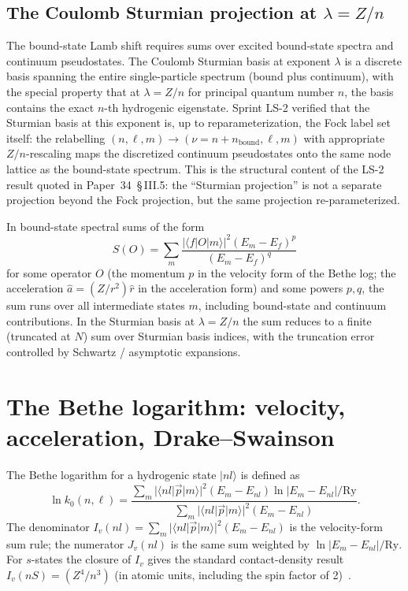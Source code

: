 \documentclass[11pt]{article}
\begin{document}
\subsection{The Coulomb Sturmian projection at $\lambda = Z/n$}

The bound-state Lamb shift requires sums over excited bound-state
spectra and continuum pseudostates.  The Coulomb Sturmian basis at
exponent $\lambda$ is a discrete basis spanning the entire
single-particle spectrum (bound plus continuum), with the special
property that at $\lambda = Z/n$ for principal quantum number $n$,
the basis contains the exact $n$-th hydrogenic eigenstate.  Sprint
LS-2 verified that the Sturmian basis at this exponent is, up to
reparameterization, the Fock label set itself: the relabelling
$(n, \ell, m) \to (\nu = n + n_\text{bound}, \ell, m)$ with appropriate
$Z/n$-rescaling maps the discretized continuum pseudostates onto the
same node lattice as the bound-state spectrum.  This is the structural
content of the LS-2 result quoted in Paper~34~\S\,III.5: the
``Sturmian projection'' is not a separate projection beyond the Fock
projection, but the same projection re-parameterized.

In bound-state spectral sums of the form
\begin{equation}
\label{eq:bs_sum_general}
S(O) = \sum_m \frac{|\langle f | O | m \rangle|^2 (E_m - E_f)^p}{(E_m - E_f)^q}
\end{equation}
for some operator $O$ (the momentum $p$ in the velocity form of the
Bethe log; the acceleration $\hat{a} = (Z/r^2) \hat{r}$ in the
acceleration form) and some powers $p, q$, the sum runs over all
intermediate states $m$, including bound-state and continuum
contributions.  In the Sturmian basis at $\lambda = Z/n$ the sum
reduces to a finite (truncated at $N$) sum over Sturmian basis
indices, with the truncation error controlled by Schwartz / asymptotic
expansions.

\section{The Bethe logarithm: velocity, acceleration, Drake--Swainson}
\label{sec:drake}

The Bethe logarithm for a hydrogenic state $|nl\rangle$ is defined as
\begin{equation}
\label{eq:bethe_log_def}
\ln k_0(n, \ell) = \frac{\sum_m |\langle nl | \vec{p} | m \rangle|^2
(E_m - E_{nl}) \ln |E_m - E_{nl}| / \mathrm{Ry}}
{\sum_m |\langle nl | \vec{p} | m \rangle|^2 (E_m - E_{nl})}.
\end{equation}
The denominator $I_v(nl) = \sum_m |\langle nl | \vec{p} | m \rangle|^2
(E_m - E_{nl})$ is the velocity-form sum rule; the numerator
$J_v(nl)$ is the same sum weighted by $\ln |E_m - E_{nl}| / \mathrm{Ry}$.
For $s$-states the closure of $I_v$ gives the standard contact-density
result $I_v(nS) = (Z^4/n^3)$ (in atomic units, including the spin
factor of 2)~\cite{drake_swainson}.
\end{document}
